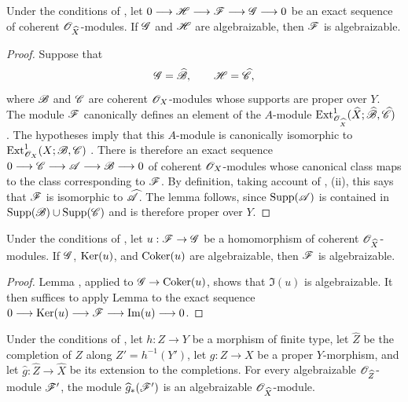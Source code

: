 \begin{lemma}[5.3.1]
\label{III.5.3.1}
Under the conditions of , let $0\longrightarrow\mathscr{H}\longrightarrow\mathscr{F}
\longrightarrow\mathscr{G}\longrightarrow0$
be an exact sequence of coherent
$\mathscr{O}_{\widehat{X}}$-modules.  If $\mathscr{G}$ and $\mathscr{H}$ are
algebraizable, then $\mathscr{F}$ is algebraizable.
\end{lemma}

\begin{proof}
Suppose that
\[
  \mathscr{G}=\widehat{\mathscr{B}},
  \qquad
  \mathscr{H}=\widehat{\mathscr{C}},
\]
where $\mathscr{B}$ and $\mathscr{C}$ are coherent $\mathscr{O}_X$-modules whose
supports are proper over $Y$.  The module $\mathscr{F}$ canonically
defines an element of the $A$-module $\operatorname{Ext}^1_{\mathscr{O}_{\widehat{X}}}
(\widehat{X};\widehat{\mathscr{B}},\widehat{\mathscr{C}})$
.  The hypotheses imply that this $A$-module is
canonically isomorphic to $\operatorname{Ext}^1_{\mathscr{O}_X}(X;\mathscr{B},\mathscr{C})$
.  There is therefore an exact sequence $0\longrightarrow\mathscr{C}\longrightarrow\mathscr{A}
\longrightarrow\mathscr{B}\longrightarrow0$
of coherent $\mathscr{O}_X$-modules whose canonical class maps to the
class corresponding to $\mathscr{F}$.  By definition, taking account of
, (ii), this says that $\mathscr{F}$ is isomorphic to
$\widehat{\mathscr{A}}$.  The lemma follows, since
$\operatorname{Supp}(\mathscr{A})$ is contained in
$\operatorname{Supp}(\mathscr{B})\cup\operatorname{Supp}(\mathscr{C})$ and is therefore proper over $Y$.
\end{proof}

\begin{corollary}[5.3.2]
\label{III.5.3.2}
Under the conditions of , let
$u:\mathscr{F}\to\mathscr{G}$ be a homomorphism of coherent
$\mathscr{O}_{\widehat{X}}$-modules.  If $\mathscr{G}$, $\operatorname{Ker}(u)$, and
$\operatorname{Coker}(u)$ are algebraizable, then $\mathscr{F}$ is algebraizable.
\end{corollary}

\begin{proof}
Lemma , applied to
$\mathscr{G}\to\operatorname{Coker}(u)$, shows that $\Im(u)$ is algebraizable.  It then
suffices to apply Lemma  to the exact sequence $0\longrightarrow\operatorname{Ker}(u)\longrightarrow\mathscr{F}
\longrightarrow\operatorname{Im}(u)\longrightarrow0$.
\end{proof}

\begin{lemma}[5.3.3]
\label{III.5.3.3}
Under the conditions of , let $h:Z\to Y$ be a
morphism of finite type, let $\widehat{Z}$ be the completion of $Z$
along $Z'=h^{-1}(Y')$, let $g:Z\to X$ be a proper $Y$-morphism,
and let $\widehat{g}:\widehat{Z}\to\widehat{X}$ be its extension to
the completions.  For every algebraizable
$\mathscr{O}_{\widehat{Z}}$-module $\mathscr{F}'$, the module
$\widehat{g}_*(\mathscr{F}')$ is an algebraizable
$\mathscr{O}_{\widehat{X}}$-module.
\end{lemma}

